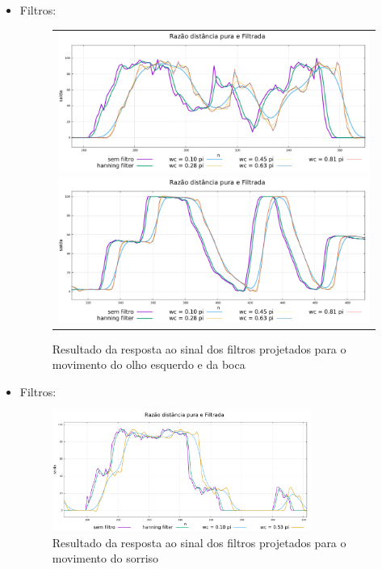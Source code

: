 \documentclass[brazil]{beamer}
\begin{document}
\begin{frame}
  \begin{itemize}
      \item Filtros:
      \begin{figure}
\centering
\begin{tabular}{c}
\includegraphics[width=0.6\linewidth]{./img/filter-result-left-eye.pdf} \\
\includegraphics[width=0.6\linewidth]{./img/filter-result-open-mouth.pdf} \\
\end{tabular}
\caption{Resultado da resposta ao sinal dos filtros projetados para o movimento do olho esquerdo e da boca}
\end{figure}
              
  \end{itemize} 
\end{frame}

\begin{frame}
  \begin{itemize}
      \item Filtros:
	\begin{figure}
        \centering
        \includegraphics[width = 0.8\textwidth, keepaspectratio]{./img/filter-result-smile.pdf}
        \caption{Resultado da resposta ao sinal dos filtros projetados para o movimento do sorriso}
      \end{figure}
              
  \end{itemize} 
\end{frame}
\end{document}
